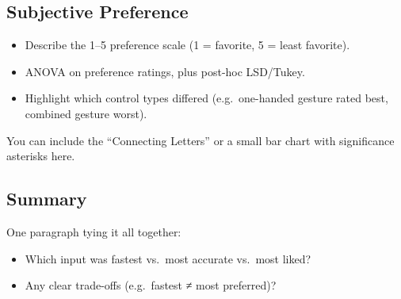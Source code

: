 \documentclass[acmlarge]{acmart}
\begin{document}
\subsection{Subjective Preference}
\begin{itemize}
  \item Describe the 1–5 preference scale (1 = favorite, 5 = least favorite).
  \item ANOVA on preference ratings, plus post-hoc LSD/Tukey.
  \item Highlight which control types differed (e.g.\ one-handed gesture rated best, combined gesture worst).
\end{itemize}
You can include the “Connecting Letters” or a small bar chart with significance asterisks here.

\subsection{Summary}
One paragraph tying it all together:
\begin{itemize}
  \item Which input was fastest vs.\ most accurate vs.\ most liked?
  \item Any clear trade-offs (e.g.\ fastest ≠ most preferred)?
\end{itemize}



\end{document}
